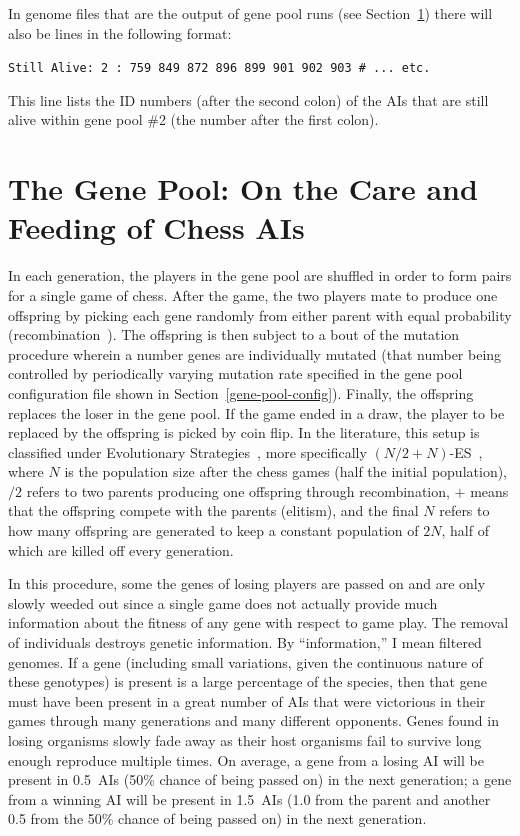 \documentclass[letterpaper]{article}
\renewcommand{\_}{\allowbreak\textunderscore\allowbreak}
\begin{document}
In genome files that are the output of gene pool runs (see Section~\ref{gene-pool-section}) there will also be lines in the following format:

\vspace{1ex}
\verb|Still Alive: 2 : 759 849 872 896 899 901 902 903 # ... etc.|
\vspace{1ex}

This line lists the ID numbers (after the second colon) of the AIs that are still alive within gene pool \#2 (the number after the first colon).

\section{The Gene Pool: On the Care and Feeding of Chess AIs}\label{gene-pool-section}
In each generation, the players in the gene pool are shuffled in order to form pairs for a single game of chess. After the game, the two players mate to produce one offspring by picking each gene randomly from either parent with equal probability (recombination~\cite{recombination-wiki}). The offspring is then subject to a bout of the mutation procedure wherein a number genes are individually mutated (that number being controlled by periodically varying mutation rate specified in the gene pool configuration file shown in Section~\ref{gene-pool-config}). Finally, the offspring replaces the loser in the gene pool. If the game ended in a draw, the player to be replaced by the offspring is picked by coin flip. In the literature, this setup is classified under Evolutionary Strategies~\cite{evolution-strategy-wiki}, more specifically \((N/2+N)\)-ES~\cite{evolution-strategy-glossary}, where \(N\) is the population size after the chess games (half the initial population), \(/2\) refers to two parents producing one offspring through recombination, \(+\) means that the offspring compete with the parents (elitism), and the final \(N\) refers to how many offspring are generated to keep a constant population of \(2N\), half of which are killed off every generation.

In this procedure, some the genes of losing players are passed on and are only slowly weeded out since a single game does not actually provide much information about the fitness of any gene with respect to game play. The removal of individuals destroys genetic information. By ``information,'' I mean filtered genomes. If a gene (including small variations, given the continuous nature of these genotypes) is present is a large percentage of the species, then that gene must have been present in a great number of AIs that were victorious in their games through many generations and many different opponents. Genes found in losing organisms slowly fade away as their host organisms fail to survive long enough reproduce multiple times. On average, a gene from a losing AI will be present in 0.5~AIs (50\% chance of being passed on) in the next generation; a gene from a winning AI will be present in 1.5~AIs (1.0 from the parent and another 0.5 from the 50\% chance of being passed on) in the next generation.
\end{document}
